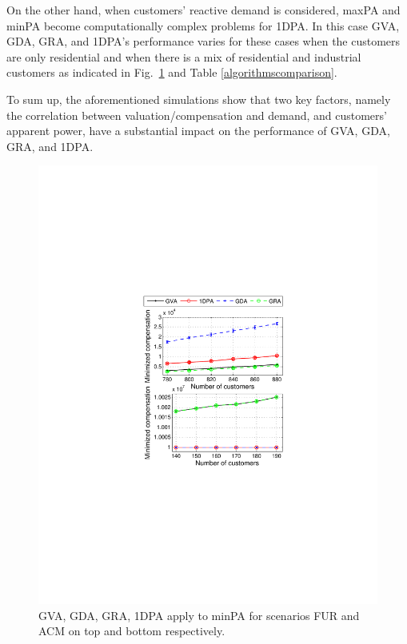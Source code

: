 On the other hand, when customers' reactive demand is considered,  {\sc maxPA} and {\sc minPA} become computationally complex problems for {\sc 1DPA}. In this case {\sc GVA}, {\sc GDA}, {\sc GRA}, and {\sc 1DPA}'s performance varies for these cases when the customers are only residential and when there is a mix of residential and industrial customers as indicated in Fig.~\ref{fig:scenariofuracm} and Table \ref{algorithmscomparison}.

To sum up, the aforementioned simulations show that two key factors, namely the correlation between valuation/compensation and demand, and customers' apparent power, have a substantial impact on the performance of {\sc GVA}, {\sc GDA}, {\sc GRA}, and {\sc 1DPA}.

\begin{figure}[!htb]\vspace{-5pt}
	\begin{center}
		\includegraphics[scale=0.7]{fig/1_8.pdf}
	\end{center}\vspace{-5pt}
\caption{{\sc GVA}, {\sc GDA}, {\sc GRA}, {\sc 1DPA} apply to {\sc minPA} for scenarios FUR and ACM on top and bottom respectively.}
	\label{fig:scenariofuracm}
\end{figure} 

